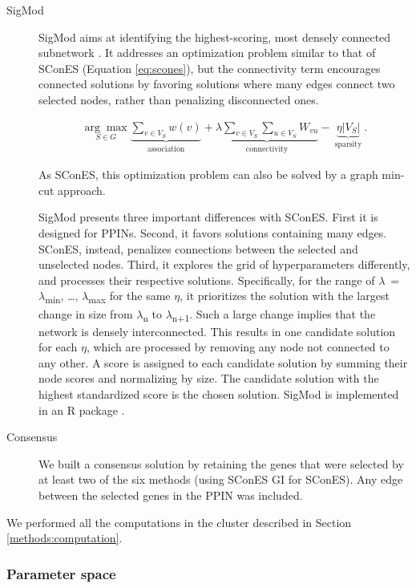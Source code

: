 \documentclass[10pt,letterpaper]{article}
\begin{document}
\begin{description}
\item[{SigMod}] SigMod aims at identifying the highest-scoring, most densely connected subnetwork \cite{liu_sigmod:_2017}. It addresses an optimization problem similar to that of SConES (Equation \ref{eq:scones}), but the connectivity term encourages connected solutions by favoring solutions where many edges connect two selected nodes, rather than penalizing disconnected ones.  

\begin{eqnarray}
\underset{S \in G}{\arg \max } \underbrace{\sum_{v \in V_S} w(v)}_{\text { association }} + \underbrace{\lambda \sum_{v \in V_S} \sum_{u \in V_S} W_{vu} }_{\text { connectivity }} -\underbrace{\eta \lvert V_S \rvert }_{\text { sparsity }}.
\end{eqnarray}

As SConES, this optimization problem can also be solved by a graph min-cut approach. 

SigMod presents three important differences with SConES. First it is designed for PPINs. Second, it favors solutions containing many edges. SConES, instead, penalizes connections between the selected and unselected nodes. Third, it explores the grid of hyperparameters differently, and processes their respective solutions. Specifically, for the range of \(\lambda\)~=~\(\lambda\)\textsubscript{min}, \dots{}, \(\lambda\)\textsubscript{max} for the same \(\eta\), it prioritizes the solution with the largest change in size from \(\lambda\)\textsubscript{n} to \(\lambda\)\textsubscript{n+1}. Such a large change implies that the network is densely interconnected. This results in one candidate solution for each \(\eta\), which are processed by removing any node not connected to any other. A score is assigned to each candidate solution by summing their node scores and normalizing by size. The candidate solution with the highest standardized score is the chosen solution. SigMod is implemented in an R package \cite{sigmod}.

\item[{Consensus}] We built a consensus solution by retaining the genes that were selected by at least two of the six methods (using SConES GI for SConES). Any edge between the selected genes in the PPIN was included.
\end{description}

We performed all the computations in the cluster described in Section \ref{methods:computation}. 

\subsubsection{Parameter space}
\label{methods:parameters}
\end{document}
